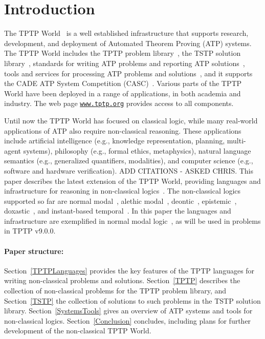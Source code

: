 \documentclass{ceurart}
\begin{document}
\section{Introduction}
\label{Introduction}

The TPTP World~\cite{Sut17} is a well established infrastructure that supports research, 
development, and deployment of Automated Theorem Proving (ATP) systems.
The TPTP World includes the TPTP problem library~\cite{Sut09}, 
the TSTP solution library~\cite{Sut10}, 
standards for writing ATP problems and reporting ATP solutions~\cite{SS+06,Sut08-KEAPPA}, 
tools and services for processing ATP problems and solutions~\cite{Sut10}, 
and it supports the CADE ATP System Competition (CASC)~\cite{Sut16}.
Various parts of the TPTP World have been deployed in a range of applications,
in both academia and industry.
The web page \href{https://www.tptp.org}{\tt www.tptp.org} provides access to all 
components.

Until now the TPTP World has focused on classical logic, while many real-world applications of 
ATP also require non-classical reasoning. 
These applications include artificial intelligence (e.g., knowledge representation, planning, 
multi-agent systems), philosophy (e.g., formal ethics, metaphysics), natural language semantics 
(e.g., generalized quantifiers, modalities), and computer science (e.g., software and hardware 
verification).
ADD CITATIONS - ASKED CHRIS.
This paper describes the latest extension of the TPTP World, providing languages and
infrastructure for reasoning in non-classical logics~\cite{Pri08,Gob01}.
The non-classical logics supported so far are
normal modal~\cite{FM98},
alethic modal~\cite{Sch06-CPL},
deontic~\cite{Hil71},
epistemic~\cite{vDH15},
doxastic~\cite{Hin62}, and
instant-based temporal~\cite{GR22}.
In this paper the languages and infrastructure are exemplified in normal modal logic~\cite{BBW06},
as will be used in problems in TPTP v9.0.0.

\paragraph{Paper structure:}
Section~\ref{TPTPLanguages} provides the key features of the TPTP languages for writing
non-classical problems and solutions. 
Section~\ref{TPTP} describes the collection of non-classical problems for the TPTP problem library, 
and Section~\ref{TSTP} the collection of solutions to such problems in the TSTP solution library.
Section~\ref{SystemsTools} gives an overview of ATP systems and tools for non-classical logics.
Section~\ref{Conclusion} concludes, including plans for further development of the non-classical
TPTP World.
\end{document}
